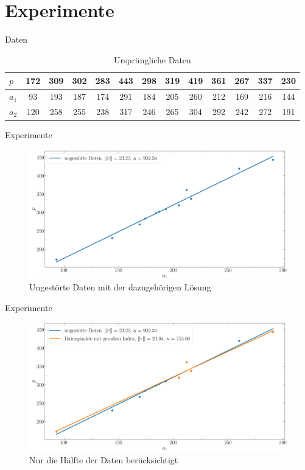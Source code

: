 \documentclass{beamer}
\begin{document}
\section{Experimente}

\begin{frame}{Daten}
	\begin{table}\small
		\begin{tabular}{l || c c c c c c c c c c c c}
			$p$ & 172&309&302&283&443&298&319&419&361&267&337&230\\
			\hline
			$a_1$ & 93&193&187&174&291&184&205&260&212&169&216&144\\
			\hline
			$a_2$ & 120&258&255&238&317&246&265&304&292&242&272&191\\
		\end{tabular}
		\caption{Ursprüngliche Daten}
	\end{table}
\end{frame}

\begin{frame}{Experimente}
	\begin{figure}
		\includegraphics[width=\textwidth]{Bilder/ungest.png}
		\caption{Ungestörte Daten mit der dazugehörigen Lösung}
	\end{figure}
\end{frame}

\begin{frame}{Experimente}
	\begin{figure}
		\includegraphics[width=\textwidth]{Bilder/ungest+gerad.png}
		\caption{Nur die Hälfte der Daten berücksichtigt}
	\end{figure}
 \end{frame}
\end{document}
